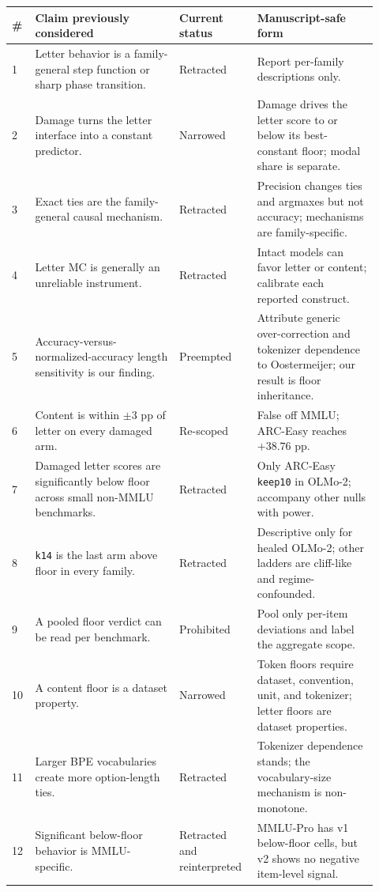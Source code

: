 \begin{table}[H]
\centering
\scriptsize
\setlength{\tabcolsep}{3.5pt}
\begin{tabular}{p{0.05\linewidth}p{0.37\linewidth}p{0.19\linewidth}p{0.31\linewidth}}
\toprule
\# & Claim previously considered & Current status & Manuscript-safe form \\
\midrule
1 & Letter behavior is a family-general step function or sharp phase transition. & Retracted & Report per-family descriptions only. \\
2 & Damage turns the letter interface into a constant predictor. & Narrowed & Damage drives the letter score to or below its best-constant floor; modal share is separate. \\
3 & Exact ties are the family-general causal mechanism. & Retracted & Precision changes ties and argmaxes but not accuracy; mechanisms are family-specific. \\
4 & Letter MC is generally an unreliable instrument. & Retracted & Intact models can favor letter or content; calibrate each reported construct. \\
5 & Accuracy-versus-normalized-accuracy length sensitivity is our finding. & Preempted & Attribute generic over-correction and tokenizer dependence to Oostermeijer; our result is floor inheritance. \\
6 & Content is within $\pm3$ pp of letter on every damaged arm. & Re-scoped & False off MMLU; ARC-Easy reaches $+38.76$ pp. \\
7 & Damaged letter scores are significantly below floor across small non-MMLU benchmarks. & Retracted & Only ARC-Easy \texttt{keep10} in OLMo-2; accompany other nulls with power. \\
8 & \texttt{k14} is the last arm above floor in every family. & Retracted & Descriptive only for healed OLMo-2; other ladders are cliff-like and regime-confounded. \\
9 & A pooled floor verdict can be read per benchmark. & Prohibited & Pool only per-item deviations and label the aggregate scope. \\
10 & A content floor is a dataset property. & Narrowed & Token floors require dataset, convention, unit, and tokenizer; letter floors are dataset properties. \\
11 & Larger BPE vocabularies create more option-length ties. & Retracted & Tokenizer dependence stands; the vocabulary-size mechanism is non-monotone. \\
12 & Significant below-floor behavior is MMLU-specific. & Retracted and reinterpreted & MMLU-Pro has v1 below-floor cells, but v2 shows no negative item-level signal. \\

\end{tabular}
\end{table}
